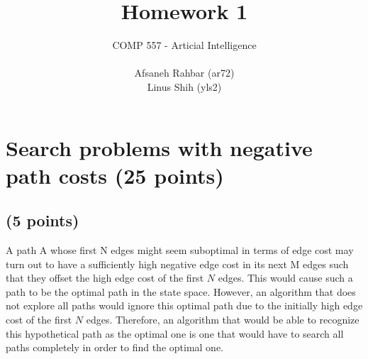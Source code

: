 \documentclass[12pt]{article}
\begin{document}
 \SetVertexNormal[Shape      = circle,
                 FillColor  = orange,
                 LineWidth  = 2pt]
\SetUpEdge[lw         = 1.5pt,
           color      = black,
           labelcolor = white,
           labeltext  = red,
           labelstyle = {sloped,draw,text=blue}]     
 
 
\title{Homework 1}%
\author{%
COMP 557 - Articial Intelligence \\
\\
Afsaneh Rahbar (ar72) \\
Linus Shih (yls2)  
} %
 
\maketitle

\section{Search problems with negative path costs (25 points)}
\subsection{(5 points)}
A path A whose first N edges might seem suboptimal in terms of edge cost may turn out to have a sufficiently high negative edge cost in its next M edges such that they offset the high edge cost of the first $N$ edges. This would cause such a path to be the optimal path in the state space. However, an algorithm that does not explore all paths would ignore this optimal path due to the initially high edge cost of the first $N$ edges. Therefore, an algorithm that would be able to recognize this hypothetical path as the optimal one is one that would have to search all paths completely in order to find the optimal one. 
\end{document}
